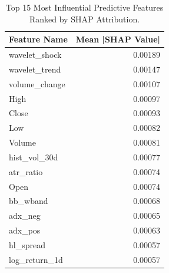 \begin{table}
\caption{Top 15 Most Influential Predictive Features Ranked by SHAP Attribution.}
\label{tab:shap_importance}
\begin{tabular}{lr}
\toprule
Feature Name & Mean |SHAP Value| \\
\midrule
wavelet_shock & 0.00189 \\
wavelet_trend & 0.00147 \\
volume_change & 0.00107 \\
High & 0.00097 \\
Close & 0.00093 \\
Low & 0.00082 \\
Volume & 0.00081 \\
hist_vol_30d & 0.00077 \\
atr_ratio & 0.00074 \\
Open & 0.00074 \\
bb_wband & 0.00068 \\
adx_neg & 0.00065 \\
adx_pos & 0.00063 \\
hl_spread & 0.00057 \\
log_return_1d & 0.00057 \\
\bottomrule
\end{tabular}
\end{table}
